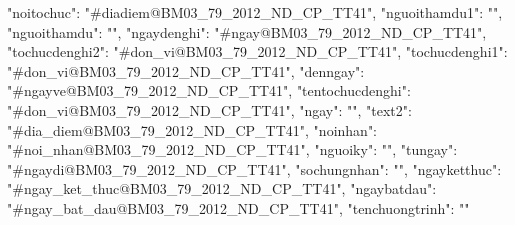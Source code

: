 {
	"noitochuc": "#diadiem@BM03_79_2012_ND_CP_TT41",
	"nguoithamdu1": "",
	"nguoithamdu": "",
	"ngaydenghi": "#ngay@BM03_79_2012_ND_CP_TT41",
	"tochucdenghi2": "#don_vi@BM03_79_2012_ND_CP_TT41",
	"tochucdenghi1": "#don_vi@BM03_79_2012_ND_CP_TT41",
	"denngay": "#ngayve@BM03_79_2012_ND_CP_TT41",
	"tentochucdenghi": "#don_vi@BM03_79_2012_ND_CP_TT41",
	"ngay": "",
	"text2": "#dia_diem@BM03_79_2012_ND_CP_TT41",
	"noinhan": "#noi_nhan@BM03_79_2012_ND_CP_TT41",
	"nguoiky": "",
	"tungay": "#ngaydi@BM03_79_2012_ND_CP_TT41",
	"sochungnhan": "",
	"ngayketthuc": "#ngay_ket_thuc@BM03_79_2012_ND_CP_TT41",
	"ngaybatdau": "#ngay_bat_dau@BM03_79_2012_ND_CP_TT41",
	"tenchuongtrinh": ""
}